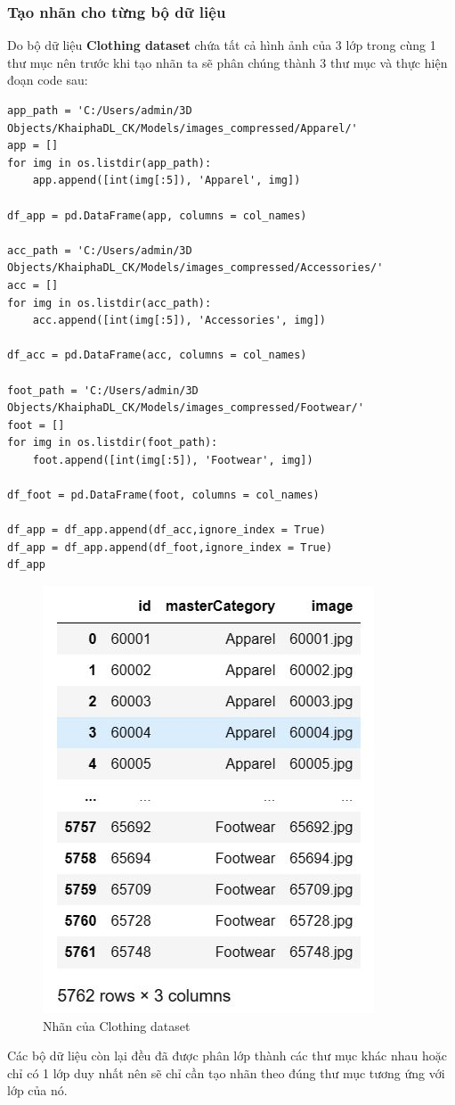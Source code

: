 \subsubsection{Tạo nhãn cho từng bộ dữ liệu}
Do bộ dữ liệu \textbf{Clothing dataset} chứa tất cả hình ảnh của 3 lớp trong cùng 1 thư mục nên trước khi tạo nhãn ta sẽ phân chúng thành 3 thư mục và thực hiện đoạn code sau:
\begin{lstlisting}
app_path = 'C:/Users/admin/3D Objects/KhaiphaDL_CK/Models/images_compressed/Apparel/'
app = []
for img in os.listdir(app_path):   
    app.append([int(img[:5]), 'Apparel', img])
    
df_app = pd.DataFrame(app, columns = col_names)

acc_path = 'C:/Users/admin/3D Objects/KhaiphaDL_CK/Models/images_compressed/Accessories/'
acc = []
for img in os.listdir(acc_path):   
    acc.append([int(img[:5]), 'Accessories', img])
    
df_acc = pd.DataFrame(acc, columns = col_names)

foot_path = 'C:/Users/admin/3D Objects/KhaiphaDL_CK/Models/images_compressed/Footwear/'
foot = []
for img in os.listdir(foot_path):   
    foot.append([int(img[:5]), 'Footwear', img])
    
df_foot = pd.DataFrame(foot, columns = col_names)

df_app = df_app.append(df_acc,ignore_index = True)
df_app = df_app.append(df_foot,ignore_index = True)
df_app
\end{lstlisting}
\begin{center}
    \begin{figure}[!h]
        \centering
        \includegraphics[scale = 1.4]{fileanh/48.jpg}
        \caption{Nhãn của Clothing dataset}
    \end{figure}
\end{center}
\begin{cy}
Các bộ dữ liệu còn lại đều đã được phân lớp thành các thư mục khác nhau hoặc chỉ có 1 lớp duy nhất nên sẽ chỉ cần tạo nhãn theo đúng thư mục tương ứng với lớp của nó.
\end{cy}
\newpage
